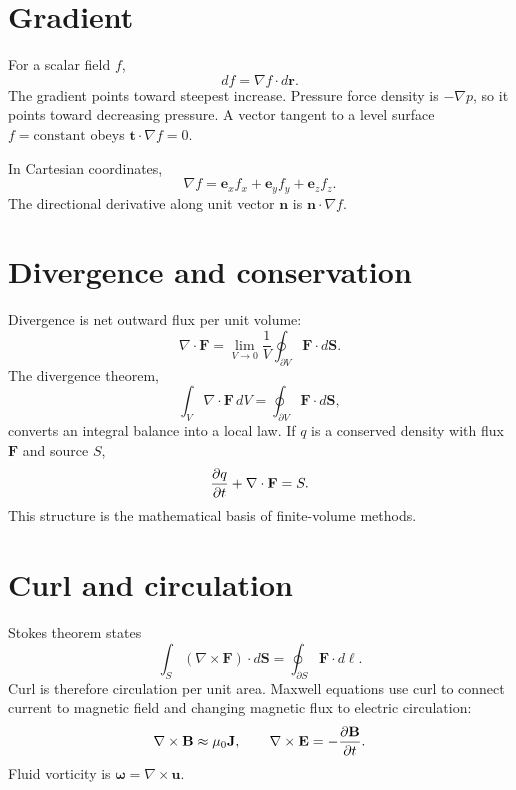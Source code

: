 \documentclass[11pt]{article}
\begin{document}
\section{Gradient}

For a scalar field $f$,
\begin{equation}
df=\nabla f\cdot d\mathbf r.
\end{equation}
The gradient points toward steepest increase. Pressure force density is $-\nabla p$, so it points toward decreasing pressure. A vector tangent to a level surface $f=\mathrm{constant}$ obeys $\mathbf t\cdot\nabla f=0$.

In Cartesian coordinates,
\begin{equation}
\nabla f=\mathbf e_x f_x+\mathbf e_y f_y+\mathbf e_z f_z.
\end{equation}
The directional derivative along unit vector $\mathbf n$ is $\mathbf n\cdot\nabla f$.


\section{Divergence and conservation}

Divergence is net outward flux per unit volume:
\begin{equation}
\nabla\cdot\mathbf F=
\lim_{V\to0}\frac{1}{V}\oint_{\partial V}\mathbf F\cdot d\mathbf S.
\end{equation}
The divergence theorem,
\begin{equation}
\int_V\nabla\cdot\mathbf F\,dV
=\oint_{\partial V}\mathbf F\cdot d\mathbf S,
\end{equation}
converts an integral balance into a local law. If $q$ is a conserved density with flux $\mathbf F$ and source $S$,
\begin{equation}
\pdv{q}{t}+\nabla\cdot\mathbf F=S.
\end{equation}
This structure is the mathematical basis of finite-volume methods.


\section{Curl and circulation}

Stokes theorem states
\begin{equation}
\int_S(\nabla\times\mathbf F)\cdot d\mathbf S
=\oint_{\partial S}\mathbf F\cdot d\boldsymbol\ell.
\end{equation}
Curl is therefore circulation per unit area. Maxwell equations use curl to connect current to magnetic field and changing magnetic flux to electric circulation:
\begin{equation}
\nabla\times\mathbf B\approx\mu_0\mathbf J,\qquad
\nabla\times\mathbf E=-\pdv{\mathbf B}{t}.
\end{equation}
Fluid vorticity is $\boldsymbol\omega=\nabla\times\mathbf u$.
\end{document}
